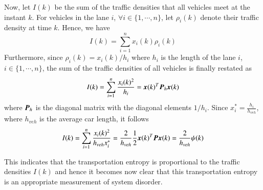 \documentclass[preprint,authoryear,12pt]{elsarticle}
\renewcommand{\vec}[1]{\mbox{\boldmath$#1$}}
\newcommand{\mat}[1]{\mbox{\boldmath$#1$}}
\begin{document}
Now, let $I(k)$ be the sum of the traffic densities that all vehicles meet at the instant $k$. For vehicles in the lane $i$, $\forall i\in \{1,\cdots,n\}$, let $\rho_i(k)$ denote their traffic density at time $k$. Hence, we have
$$I(k)=\sum_{i=1}^{n} x_i(k)\rho_i(k)$$
Furthermore, since $\rho_i(k)=x_i(k)/h_i$ where $h_i$ is the length of the lane $i$, $i\in \{1,\cdots,n\}$, the sum of the traffic densities of all vehicles is finally restated as
\begin{equation}
\label{equ:quality_service}
I(k)=\sum_{i=1}^{n}
\frac{x_i(k)^2}{h_i}=\vec{x}(k)^T\mat{P}_h\vec{x}(k)
\end{equation}
where $\mat{P}_h$ is the diagonal matrix with the diagonal elements $1/h_i$. Since $x_i^*=\frac{h_i}{h_{veh}}$, where $h_{veh}$ is the average car length, it follows
\begin{equation}
I(k) = \sum_{i=1}^{n}\frac{x_i(k)^2}{h_{veh} x_i^*}
= \frac{2}{h_{veh}} \frac{1}{2}\vec{x}(k)^T\mat{P}\vec{x}(k)
= \frac{2}{h_{veh}} \psi(k)
\end{equation}

This indicates that the transportation entropy is proportional to the traffic densities $I(k)$ and hence it becomes now clear that this transportation entropy is an appropriate measurement of system disorder.


%
\end{document}
